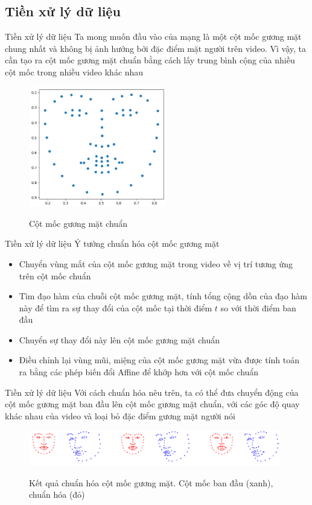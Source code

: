 \subsection{Tiền xử lý dữ liệu}
\begin{frame}{Tiền xử lý dữ liệu}
    Ta mong muốn đầu vào của mạng là một cột mốc gương mặt chung nhất và không bị ảnh hưởng bởi đặc điểm mặt người trên video. Vì vậy, ta cần tạo ra cột mốc gương mặt chuẩn bằng cách lấy trung bình cộng của nhiều cột mốc trong nhiều video khác nhau
    \begin{figure}[H]
        \centering
        \includegraphics[width=6cm]{images/standard_landmark.png}
        \label{fig:standard_landmark}
        \caption{Cột mốc gương mặt chuẩn}
    \end{figure}
\end{frame}

\begin{frame}{Tiền xử lý dữ liệu}
    Ý tưởng chuẩn hóa cột mốc gương mặt
    \begin{itemize}
        \item Chuyển vùng mắt của cột mốc gương mặt trong video về vị trí tương ứng trên cột mốc chuẩn
        \item Tìm đạo hàm của chuỗi cột mốc gương mặt, tính tổng cộng dồn của đạo hàm này để tìm ra sự thay đổi của cột mốc tại thời điểm $t$ so với thời điểm ban đầu
        \item Chuyển sự thay đổi này lên cột mốc gương mặt chuẩn
        \item Điều chỉnh lại vùng mũi, miệng của cột mốc gương mặt vừa được tính toán ra bằng các phép biến đổi Affine để khớp hơn với cột mốc chuẩn
    \end{itemize}
\end{frame}

\begin{frame}{Tiền xử lý dữ liệu}
    Với cách chuẩn hóa nêu trên, ta có thể đưa chuyển động của cột mốc gương mặt ban đầu lên cột mốc gương mặt chuẩn, với các góc độ quay khác nhau của video và loại bỏ đặc điểm gương mặt người nói
    \begin{figure}[H]
        \centering
        \includegraphics[width=11cm]{images/standardized_landmark.png}
        \label{fig:standardized_landmark}
        \caption{Kết quả chuẩn hóa cột mốc gương mặt. Cột mốc ban đầu (xanh), chuẩn hóa (đỏ)}
    \end{figure}
\end{frame}

